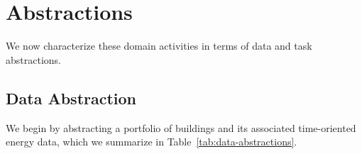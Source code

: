 \documentclass[journal]{vgtc}                %
\begin{document}

\section{Abstractions}
\label{abstractions}


We now characterize these domain activities in terms of data and task abstractions.


\subsection{Data Abstraction}
\label{data-abstractions}


We begin by abstracting a portfolio of buildings and its associated time-oriented energy data, which we summarize in Table~\ref{tab:data-abstractions}.
\end{document}
